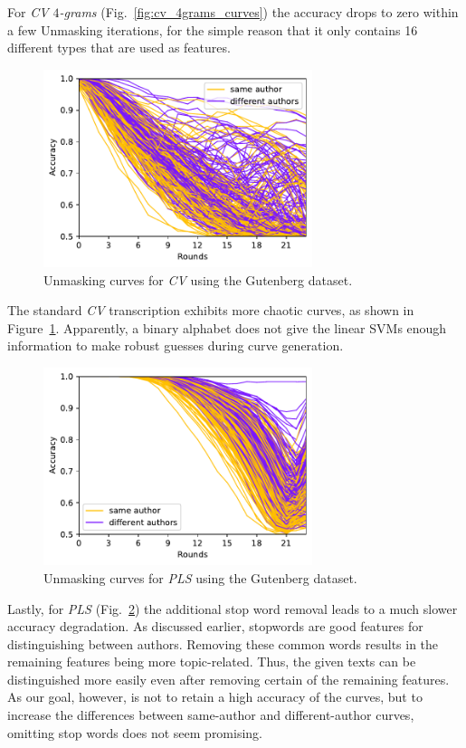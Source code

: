 For \textit{CV $4$-grams} (Fig.~\ref{fig:cv_4grams_curves}) the accuracy drops to zero within a few Unmasking iterations, for the simple reason that it only contains 16 different types that are used as features.
\begin{figure}
  \centering
  \includegraphics[width=0.7\textwidth]{figures/cv_curves}
  \caption{Unmasking curves for \textit{CV} using the Gutenberg dataset.}
  \label{fig:cv_curves}
\end{figure}
The standard \textit{CV} transcription exhibits more chaotic curves, as shown in Figure~\ref{fig:cv_curves}.
Apparently, a binary alphabet does not give the linear SVMs enough information to make robust guesses during curve generation.
\begin{figure}
  \centering
  \includegraphics[width=0.7\textwidth]{figures/pls_curves}
  \caption{Unmasking curves for \textit{PLS} using the Gutenberg dataset.}
  \label{fig:pls_curves}
\end{figure}
Lastly, for \textit{PLS} (Fig.~\ref{fig:pls_curves}) the additional stop word removal leads to a much slower accuracy degradation.
As discussed earlier, stopwords are good features for distinguishing between authors.
Removing these common words results in the remaining features being more topic-related.
Thus, the given texts can be distinguished more easily even after removing certain of the remaining features.
As our goal, however, is not to retain a high accuracy of the curves, but to increase the differences between same-author and different-author curves, omitting stop words does not seem promising.


